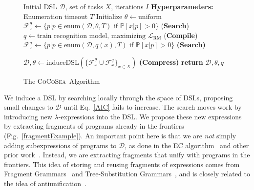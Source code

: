 \documentclass{article}
\newcommand{\system}{\textsc{CoCoSea}~}
\newcommand{\probability}{\mathds{P}} %
\begin{document}
\begin{figure}
  \begin{minipage}{0.6\textwidth}    
    \begin{algorithm}[H]
      \caption{The \system Algorithm}
      \label{mainAlgorithm}
      \begin{algorithmic}
         Initial DSL $\mathcal{D}$, set of tasks $X$, iterations $I$
        \STATE \textbf{Hyperparameters:} Enumeration timeout $T$
        \STATE Initialize $\theta\gets \text{uniform}$ %
        \STATE  $\mathcal{F}^{\theta}_x\gets \{p| p\in \text{enum}(\mathcal{D},\theta,T)\text{ if }\probability[x|p] > 0\}$ \footnotesize{(\textbf{Search})}
        \STATE $q\gets \text{train recognition model, maximizing }\mathcal{L}_{\text{RM}}$ \hspace{0.2cm}(\footnotesize{\textbf{Compile}})
        \STATE  $\mathcal{F}^{q}_x\gets\{p|p\in \text{enum}(\mathcal{D},q(x),T)\text{ if }\probability[x|p] > 0\}$ \footnotesize{\textbf{(Search)}}
        
        \STATE $\mathcal{D},\theta\gets $induceDSL$(\{\mathcal{F}^{\theta}_x\cup\mathcal{F}^{q}_x\}_{x\in X})$  \hspace{1.1cm} \footnotesize{\textbf{(Compress)}}
        \ENDFOR
        \STATE \textbf{return} $\mathcal{D},\theta,q$
      \end{algorithmic}
    \end{algorithm}
  \end{minipage}
\end{figure}%

We induce a DSL by searching locally through the space of DSLs,
proposing small changes to $\mathcal{D}$ until Eq.~\ref{AIC} fails to increase.
The search moves work by introducing new
$\lambda$-expressions into the DSL.
We propose these new expressions by extracting fragments of
programs already in the frontiers (Fig.~\ref{fragmentExample}).
An important point here is that we are \emph{not} simply adding
subexpressions of programs to $\mathcal{D}$, as done in the EC algorithm~\cite{Dechter:2013:BLV:2540128.2540316} and other prior work~\cite{DBLP:conf/ecai/LinDETM14}.  Instead, we are
extracting fragments that unify with programs in the frontiers.  This
idea of storing and reusing fragments of expressions comes from
Fragment Grammars~\cite{tim} and Tree-Substitution
Grammars~\cite{cohn2010inducing}, and is closely related to the idea
of antiunification~\cite{henderson2013cumulative}.
\end{document}
